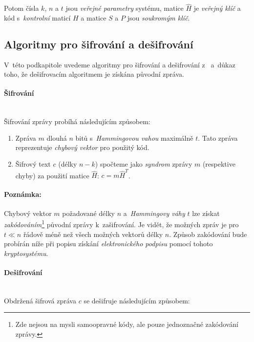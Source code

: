 \documentclass[thesis=M,czech,hidelinks]{FITthesis}[2012/06/26]
\newcommand{\0}{{\textcolor[gray]{0.75}{0}}}
\begin{document}
Potom čísla $k$, $n$ a $t$ jsou \emph{veřejné parametry} systému, matice
$\hat{H}$ je \emph{veřejný klíč} a kód s~\emph{kontrolní} maticí $H$ a matice
$S$ a $P$ jsou \emph{soukromým klíč}.


\subsection{Algoritmy pro šifrování a dešifrování}

V~této podkapitole uvedeme algoritmy pro šifrování a dešifrování
z~\cite{Niederreiter} a~důkaz toho, že dešifrovacím algoritmem je získána
původní zpráva.

\paragraph{Šifrování} \hfill \\

Šifrování zprávy probíhá následujícím způsobem:

\begin{enumerate}
    \item Zpráva $m$ dlouhá $n$ bitů s~\emph{Hammingovou vahou} maximálně $t$.
        Tato zpráva reprezentuje \emph{chybový vektor} pro použitý kód.
    \item Šifrový text $c$ (délky $n-k$) spočteme jako \emph{syndrom} zprávy
        $m$ (respektive chyby) za použití matice $\hat{H}$: $c = m \hat{H}^T$.
\end{enumerate}

\paragraph{Poznámka:} Chybový vektor $m$ požadované délky $n$ a~\emph{Hammingovy
váhy} $t$ lze získat \emph{zakódováním}\footnote{
    Zde nejsou na mysli samoopravné kódy, ale pouze jednoznačné zakódování
    zprávy.
} původní zprávy k~zašifrování. Je vidět, že možných zpráv je pro $t \ll n$
řádově méně než všech možných vektorů délky $n$. Způsob zakódování bude probírán
níže při popisu získání \emph{elektronického podpisu} pomocí tohoto
\emph{kryptosystému}.



\paragraph{Dešifrování} \hfill \\
Obdržená šifrová zpráva $c$ se dešifruje následujícím způsobem:
\end{document}
